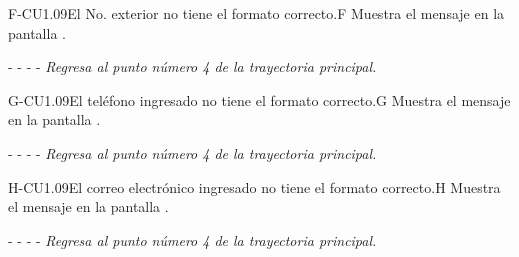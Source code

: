	   	\begin{UCtrayectoriaA}{F-CU1.09}{El No. exterior no tiene el formato correcto.}{F}
			\UCpaso[\UCsist] Muestra el mensaje  en la pantalla .
			\item[- -] - - {\em Regresa al punto número 4 de la trayectoria principal.} 
    \end{UCtrayectoriaA}

	\begin{UCtrayectoriaA}{G-CU1.09}{El teléfono ingresado no tiene el formato correcto.}{G}
			\UCpaso[\UCsist] Muestra el mensaje  en la pantalla .
			\item[- -] - - {\em Regresa al punto número 4 de la trayectoria principal.} 
    \end{UCtrayectoriaA}
    
    \begin{UCtrayectoriaA}{H-CU1.09}{El correo electrónico ingresado no tiene el formato correcto.}{H}
			\UCpaso[\UCsist] Muestra el mensaje  en la pantalla .
			\item[- -] - - {\em Regresa al punto número 4 de la trayectoria principal.} 
    \end{UCtrayectoriaA}